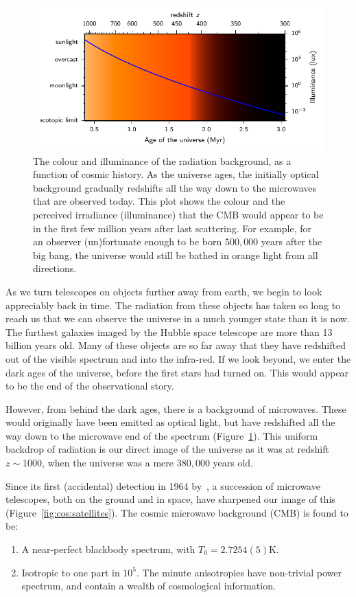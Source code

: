 \begin{figure}[tp]
  \centering
  \includegraphics[width=\textwidth]{chapters/inflationary_cosmology/figures/cmb_colour}
  \caption{The colour and illuminance of the radiation background, as a function of cosmic history. As the universe ages, the initially optical background gradually redshifts all the way down to the microwaves that are observed today. This plot shows the colour and the perceived irradiance (illuminance) that the CMB would appear to be in the first few million years after last scattering. For example, for an observer (un)fortunate enough to be born \(500,000\) years after the big bang, the universe would still be bathed in orange light from all directions.}\label{fig:cos:cmb_colour}
\end{figure}

As we turn telescopes on objects further away from earth, we begin to look appreciably back in time. The radiation from these objects has taken so long to reach us that we can observe the universe in a much younger state than it is now. The furthest galaxies imaged by the Hubble space telescope are more than 13 billion years old. Many of these objects are so far away that they have redshifted out of the visible spectrum and into the infra-red. If we look beyond, we enter the dark ages of the universe, before the first stars had turned on. This would appear to be the end of the observational story.

However, from behind the dark ages, there is a background of microwaves. These would originally have been emitted as optical light, but have redshifted all the way down to the microwave end of the spectrum (Figure~\ref{fig:cos:cmb_colour}). This uniform backdrop of radiation is our direct image of the universe as it was at redshift \(z\sim1000\), when the universe was a mere \(380,000\) years old.

Since its first (accidental) detection in 1964 by~\cite{PenziasWilson}, a succession of microwave telescopes, both on the ground and in space, have sharpened our image of this (Figure~\ref{fig:cos:satellites}).
The cosmic microwave background (CMB) is found to be:
\begin{enumerate}
  \item A near-perfect blackbody spectrum, with \(T_0=2.7254(5)\)K.
  \item Isotropic to one part in \(10^{5}\). The minute anisotropies have non-trivial power spectrum, and contain a wealth of cosmological information.
\end{enumerate}

